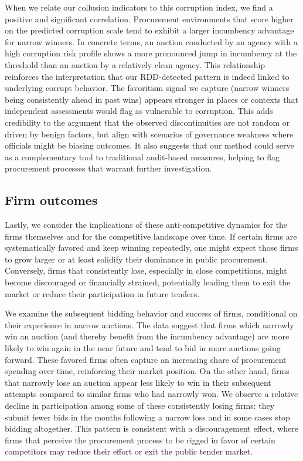 When we relate our collusion indicators to this corruption index, we find a positive and significant correlation. Procurement environments that score higher on the predicted corruption scale tend to exhibit a larger incumbency advantage for narrow winners. In concrete terms, an auction conducted by an agency with a high corruption risk profile shows a more pronounced jump in incumbency at the threshold than an auction by a relatively clean agency. This relationship reinforces the interpretation that our RDD-detected pattern is indeed linked to underlying corrupt behavior. The favoritism signal we capture (narrow winners being consistently ahead in past wins) appears stronger in places or contexts that independent assessments would flag as vulnerable to corruption. This adds credibility to the argument that the observed discontinuities are not random or driven by benign factors, but align with scenarios of governance weakness where officials might be biasing outcomes. It also suggests that our method could serve as a complementary tool to traditional audit-based measures, helping to flag procurement processes that warrant further investigation.

\subsection{Firm outcomes}
Lastly, we consider the implications of these anti-competitive dynamics for the firms themselves and for the competitive landscape over time. If certain firms are systematically favored and keep winning repeatedly, one might expect those firms to grow larger or at least solidify their dominance in public procurement. Conversely, firms that consistently lose, especially in close competitions, might become discouraged or financially strained, potentially leading them to exit the market or reduce their participation in future tenders.

We examine the subsequent bidding behavior and success of firms, conditional on their experience in narrow auctions. The data suggest that firms which narrowly win an auction (and thereby benefit from the incumbency advantage) are more likely to win again in the near future and tend to bid in more auctions going forward. These favored firms often capture an increasing share of procurement spending over time, reinforcing their market position. On the other hand, firms that narrowly lose an auction appear less likely to win in their subsequent attempts compared to similar firms who had narrowly won. We observe a relative decline in participation among some of these consistently losing firms: they submit fewer bids in the months following a narrow loss and in some cases stop bidding altogether. This pattern is consistent with a discouragement effect, where firms that perceive the procurement process to be rigged in favor of certain competitors may reduce their effort or exit the public tender market.

